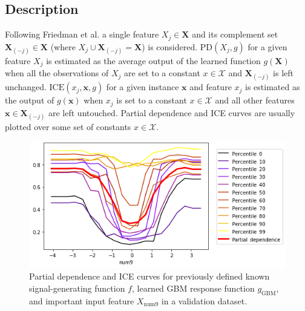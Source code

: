 \documentclass[sigconf]{acmart}
\begin{document}
\subsection{Description}
	
Following Friedman et al. a single feature $X_j \in \mathbf{X}$ and its complement set $\mathbf{X}_{(-j)} \in \mathbf{X}$ (where $X_j \cup \mathbf{X}_{(-j)} = \mathbf{X}$) is considered. $\text{PD}(X_j, g)$ for a given feature $X_j$ is estimated as the average output of the learned function $g(\mathbf{X})$ when all the observations of $X_j$ are set to a constant $x \in \mathcal{X}$ and $\mathbf{X}_{(-j)}$ is left unchanged. $\text{ICE}(x_j, \mathbf{x}, g)$ for a given instance $\mathbf{x}$ and feature $x_j$ is estimated as the output of $g(\mathbf{x})$ when $x_j$ is set to a constant $x \in \mathcal{X}$ and all other features $\mathbf{x} \in \mathbf{X}_{(-j)}$ are left untouched. Partial dependence and ICE curves are usually plotted over some set of constants $x \in \mathcal{X}$. 

\begin{figure}[htb]
	\begin{center}
		\includegraphics[scale=0.45]{img/figure_4.png}
		\caption{Partial dependence and ICE curves for previously defined known signal-generating function $f$,  learned GBM response function $g_{\text{GBM}}$, and important input feature $X_{\text{num}9}$ in a validation dataset.}
		\label{fig:pdp_ice}
	\end{center}
\end{figure}
\end{document}
